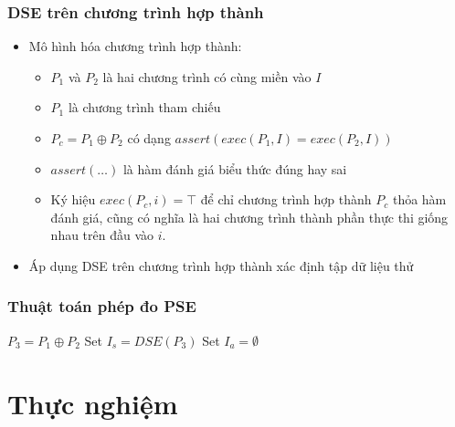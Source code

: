 \documentclass{beamer}
\begin{document}
\begin{frame}
  \frametitle{DSE trên chương trình hợp thành}
  \begin{itemize}  	
  	\item Mô hình hóa chương trình hợp thành:
  	\begin{itemize}
  		\item $P_1$ và $P_2$ là hai chương trình có cùng miền vào $I$
  		\item $P_1$ là chương trình tham chiếu
  		\item $P_c = P_1 \oplus P_2$ có dạng
  		$assert(exec(P_{1}, I) = exec(P_{2}, I))$
  		\item  $assert(\dots)$ là hàm đánh giá biểu thức đúng hay sai
  		\item Ký hiệu $exec(P_c,i) = \top$ để chỉ
  		chương trình hợp thành $P_c$ thỏa hàm đánh giá, cũng có nghĩa là hai
  		chương trình thành phần thực thi giống nhau trên đầu vào $i$.  				
  	\end{itemize}
  \item Áp dụng DSE trên chương trình hợp thành xác định tập dữ liệu thử 
  \end{itemize}
\end{frame}


\begin{frame}
  \frametitle{Thuật toán phép đo PSE}
  \begin{algorithm}[H]
  	$P_{3} = P_1 \oplus P_2$\;
  	Set $I_{s} = DSE(P_{3})$ \;
  	Set $I_{a} = \emptyset$ \;
  	{  			
  	}
  \end{algorithm}
\end{frame}


\section{Thực nghiệm}
\end{document}
